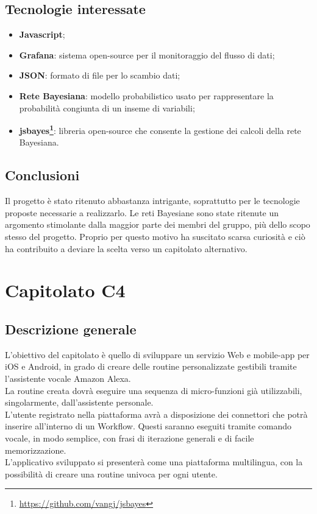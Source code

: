\documentclass[11pt,a4paper]{article}
\begin{document}
\subsection{Tecnologie interessate}
\begin{itemize}
\item \textbf{Javascript};
\item \textbf{Grafana}: sistema open-source per il monitoraggio del flusso di dati;
\item \textbf{JSON}: formato di file per lo scambio dati;
\item \textbf{Rete Bayesiana}: modello probabilistico usato per rappresentare la probabilità congiunta di un inseme di variabili;
\item \textbf{jsbayes\footnote{\url{https://github.com/vangj/jsbayes}}}: libreria open-source che consente la gestione dei calcoli della rete Bayesiana.
\end{itemize}

\subsection{Conclusioni}
	Il progetto è stato ritenuto abbastanza intrigante, soprattutto per le tecnologie proposte necessarie a realizzarlo. Le reti Bayesiane sono state ritenute un argomento stimolante dalla maggior parte dei membri del gruppo, più dello scopo stesso del progetto. Proprio per questo motivo ha suscitato scarsa curiosità e
	ciò ha contribuito a deviare la scelta verso un capitolato alternativo.
	\newpage
\section{Capitolato C4}
	\subsection{Descrizione generale}
L'obiettivo del capitolato è quello di sviluppare un servizio Web e mobile-app per iOS e Android, in grado di creare delle routine personalizzate gestibili tramite l'assistente vocale Amazon Alexa.
\\ 
La routine creata dovrà eseguire una sequenza di micro-funzioni già utilizzabili, singolarmente, dall'assistente personale.
\\
L'utente registrato nella piattaforma avrà a disposizione dei connettori che potrà inserire all'interno di un Workflow. Questi saranno eseguiti tramite comando vocale, in modo semplice, con frasi di iterazione generali e di facile memorizzazione.
\\
L'applicativo sviluppato si presenterà come una piattaforma multilingua, con la possibilità di creare una routine univoca per ogni utente.
\end{document}

